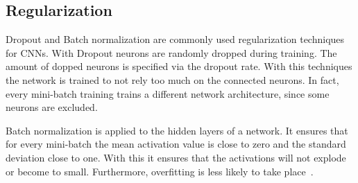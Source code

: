 
\subsection{Regularization}
Dropout and Batch normalization are commonly used regularization techniques for \glspl{CNN}.
With Dropout neurons are randomly dropped during training.
The amount of dopped neurons is specified via the dropout rate.
With this techniques the network is trained to not rely too much on the connected neurons.
In fact, every mini-batch training trains a different network architecture, since some neurons are excluded.

Batch normalization is applied to the hidden layers of a network.
It ensures that for every mini-batch the mean activation value
is close to zero and the standard deviation close to one.
With this it ensures that the activations will not explode or become to small.
Furthermore, overfitting is less likely to take place~\cite{advanceddeeplearningpython}.


